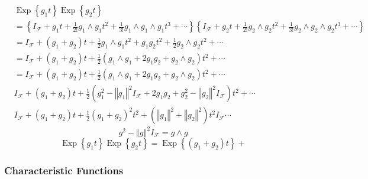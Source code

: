 \documentclass[aps,preprint]{revtex4}%
\begin{document}
\begin{align}
&  \operatorname{Exp}\left\{  g_{1}t\right\}  \operatorname{Exp}\left\{
g_{2}t\right\} \\
&  =\left\{  I_{\mathcal{F}}+g_{1}t+\frac{1}{2!}g_{1}\wedge g_{1}t^{2}%
+\frac{1}{3!}g_{1}\wedge g_{1}\wedge g_{1}t^{3}+\cdots\right\}  \left\{
I_{\mathcal{F}}+g_{2}t+\frac{1}{2!}g_{2}\wedge g_{2}t^{2}+\frac{1}{3!}%
g_{2}\wedge g_{2}\wedge g_{2}t^{3}+\cdots\right\} \\
&  =I_{\mathcal{F}}+\left(  g_{1}+g_{2}\right)  t+\frac{1}{2}g_{1}\wedge
g_{1}t^{2}+g_{1}g_{2}t^{2}+\frac{1}{2}g_{2}\wedge g_{2}t^{2}+\cdots\\
&  =I_{\mathcal{F}}+\left(  g_{1}+g_{2}\right)  t+\frac{1}{2}\left(
g_{1}\wedge g_{1}+2g_{1}g_{2}+g_{2}\wedge g_{2}\right)  t^{2}+\cdots\\
&  =I_{\mathcal{F}}+\left(  g_{1}+g_{2}\right)  t+\frac{1}{2}\left(
g_{1}\wedge g_{1}+2g_{1}g_{2}+g_{2}\wedge g_{2}\right)  t^{2}+\cdots\\
&  I_{\mathcal{F}}+\left(  g_{1}+g_{2}\right)  t+\frac{1}{2}\left(  g_{1}%
^{2}-\left\Vert \mathit{g}_{1}\right\Vert ^{2}I_{\mathcal{F}}+2g_{1}%
g_{2}+g_{2}^{2}-\left\Vert \mathit{g}_{2}\right\Vert ^{2}I_{\mathcal{F}%
}\right)  t^{2}+\cdots\\
&  I_{\mathcal{F}}+\left(  g_{1}+g_{2}\right)  t+\frac{1}{2}\left(
g_{1}+g_{2}\right)  ^{2}t^{2}+\left(  \left\Vert \mathit{g}_{1}\right\Vert
^{2}+\left\Vert \mathit{g}_{2}\right\Vert ^{2}\right)  t^{2}I_{\mathcal{F}%
}\cdots
\end{align}%
\begin{equation}
g^{2}-\left\Vert \mathit{g}\right\Vert ^{2}I_{\mathcal{F}}=g\wedge g
\end{equation}%
\begin{equation}
\operatorname{Exp}\left\{  g_{1}t\right\}  \operatorname{Exp}\left\{
g_{2}t\right\}  =\operatorname{Exp}\left\{  \left(  g_{1}+g_{2}\right)
t\right\}  +
\end{equation}


\subsubsection{Characteristic Functions}
\end{document}
